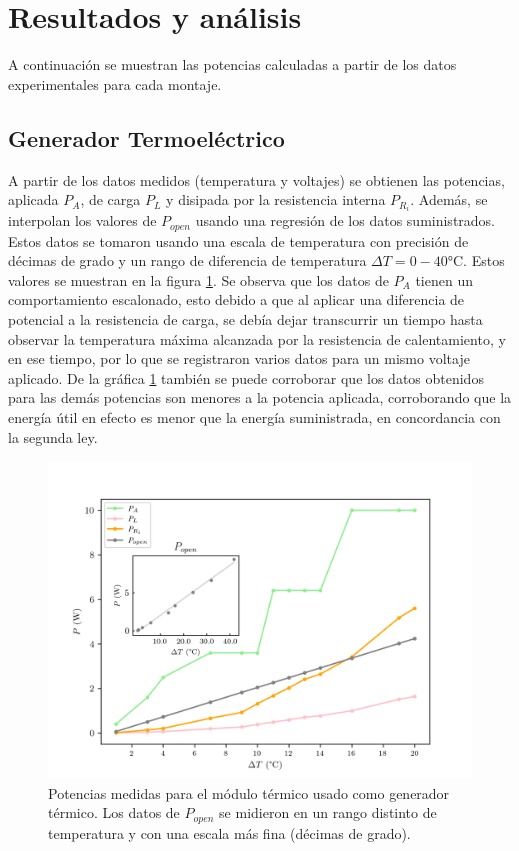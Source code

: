 \section{Resultados y análisis}

A continuación se muestran las potencias calculadas a partir de los datos experimentales para cada montaje. 
\subsection{Generador Termoeléctrico}

A partir de los datos medidos (temperatura y voltajes) se obtienen las potencias, aplicada $P_A$, de carga $P_L$ y disipada por la resistencia interna $P_{R_i}$. Además, se interpolan los valores de $P_{open}$ usando una regresión de los datos suministrados. Estos datos se tomaron usando una escala de temperatura con precisión de décimas de grado y un rango de diferencia de temperatura  $\Delta T = 0 - 40 \si{\celsius}$. Estos valores se muestran en la figura \ref{fig:gen_powers}. Se observa que los datos de $P_A$ tienen un comportamiento escalonado, esto debido a que al aplicar una diferencia de potencial a la resistencia de carga, se debía dejar transcurrir un tiempo hasta observar la temperatura máxima alcanzada por la resistencia de calentamiento, y en ese tiempo, por lo que se registraron varios datos para un mismo voltaje aplicado. De la gráfica \ref{fig:gen_powers} también se puede corroborar que los datos obtenidos para las demás potencias son menores a la potencia aplicada, corroborando que la energía útil en efecto es menor que la energía suministrada, en concordancia con la segunda ley.

\begin{figure}[ht]
    \centering
    \includegraphics[width = 0.8\linewidth]{img/gen_powers.png}
    \caption{Potencias medidas para el módulo térmico usado como generador térmico. Los datos de $P_{open}$ se midieron en un rango distinto de temperatura y con una escala más fina (décimas de grado).}
    \label{fig:gen_powers}
\end{figure}

